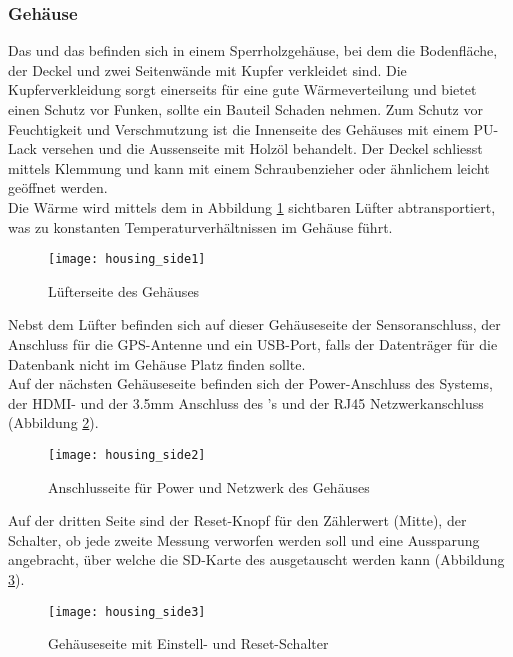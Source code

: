 \subsubsection{Gehäuse}
Das \rpi und das \hwb befinden sich in einem Sperrholzgehäuse, bei dem die Bodenfläche, der Deckel und zwei Seitenwände mit Kupfer verkleidet sind. 
Die Kupferverkleidung sorgt einerseits für eine gute Wärmeverteilung und bietet einen Schutz vor Funken, sollte ein Bauteil Schaden nehmen.
Zum Schutz vor Feuchtigkeit und Verschmutzung ist die Innenseite des Gehäuses mit einem PU-Lack versehen und die Aussenseite mit Holzöl behandelt. 
Der Deckel schliesst mittels Klemmung und kann mit einem Schraubenzieher oder ähnlichem leicht geöffnet werden.\\
Die Wärme wird mittels dem in Abbildung \ref{fig:housing_side1} sichtbaren Lüfter abtransportiert, was zu konstanten Temperaturverhältnissen im Gehäuse führt.
\begin{figure}[H]
	\centering
	\texttt{[image: housing\_side1]}
	\caption{Lüfterseite des Gehäuses}
	\label{fig:housing_side1}
\end{figure}
Nebst dem Lüfter befinden sich auf dieser Gehäuseseite der Sensoranschluss, der Anschluss für die GPS-Antenne und ein USB-Port, falls der Datenträger für die Datenbank nicht im Gehäuse Platz finden sollte.\\
Auf der nächsten Gehäuseseite befinden sich der Power-Anschluss des Systems, der HDMI- und der 3.5mm Anschluss des \rpi{}'s und der RJ45 Netzwerkanschluss (Abbildung \ref{fig:housing_side2}).
\begin{figure}[H]
	\centering
	\texttt{[image: housing\_side2]}
	\caption{Anschlusseite für Power und Netzwerk des Gehäuses}
	\label{fig:housing_side2}
\end{figure}
Auf der dritten Seite sind der Reset-Knopf für den Zählerwert (Mitte), der Schalter, ob jede zweite Messung verworfen werden soll und eine Aussparung angebracht, über welche die SD-Karte des \rpi ausgetauscht werden kann (Abbildung \ref{fig:housing_side3}).
\begin{figure}[H]
	\centering
	\texttt{[image: housing\_side3]}
	\caption{Gehäuseseite mit Einstell- und Reset-Schalter}
	\label{fig:housing_side3}
\end{figure}